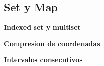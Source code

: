 \subsection{Set y Map}
    \textbf{Indexed set y multiset}
    

    \textbf{Compresion de coordenadas}
    

    \textbf{Intervalos consecutivos}
    